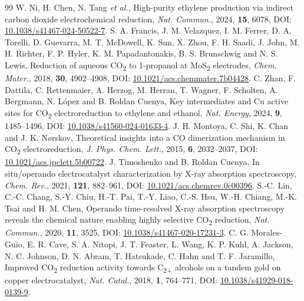 \begin{thebibliography}{99}
 W. Ni, H. Chen, N. Tang \textit{et al.}, High-purity ethylene production via indirect carbon dioxide electrochemical reduction, \textit{Nat. Commun.}, 2024, \textbf{15}, 6078, DOI: \href{https://doi.org/10.1038/s41467-024-50522-7}{10.1038/s41467-024-50522-7}.
 S. A. Francis, J. M. Velazquez, I. M. Ferrer, D. A. Torelli, D. Guevarra, M. T. McDowell, K. Sun, X. Zhou, F. H. Saadi, J. John, M. H. Richter, F. P. Hyler, K. M. Papadantonakis, B. S. Brunschwig and N. S. Lewis, Reduction of aqueous CO\textsubscript{2} to 1-propanol at MoS\textsubscript{2} electrodes, \textit{Chem. Mater.}, 2018, \textbf{30}, 4902--4908, DOI: \href{https://doi.org/10.1021/acs.chemmater.7b04428}{10.1021/acs.chemmater.7b04428}.
 C. Zhan, F. Dattila, C. Rettenmaier, A. Herzog, M. Herran, T. Wagner, F. Scholten, A. Bergmann, N. L\'opez and B. Roldan Cuenya, Key intermediates and Cu active sites for CO\textsubscript{2} electroreduction to ethylene and ethanol, \textit{Nat. Energy}, 2024, \textbf{9}, 1485--1496, DOI: \href{https://doi.org/10.1038/s41560-024-01633-4}{10.1038/s41560-024-01633-4}.
 J. H. Montoya, C. Shi, K. Chan and J. K. N\o rskov, Theoretical insights into a CO dimerization mechanism in CO\textsubscript{2} electroreduction, \textit{J. Phys. Chem. Lett.}, 2015, \textbf{6}, 2032--2037, DOI: \href{https://doi.org/10.1021/acs.jpclett.5b00722}{10.1021/acs.jpclett.5b00722}.
 J. Timoshenko and B. Roldan Cuenya, In situ/operando electrocatalyst characterization by X-ray absorption spectroscopy, \textit{Chem. Rev.}, 2021, \textbf{121}, 882--961, DOI: \href{https://doi.org/10.1021/acs.chemrev.0c00396}{10.1021/acs.chemrev.0c00396}.
 S.-C. Lin, C.-C. Chang, S.-Y. Chiu, H.-T. Pai, T.-Y. Liao, C.-S. Hsu, W.-H. Chiang, M.-K. Tsai and H. M. Chen, Operando time-resolved X-ray absorption spectroscopy reveals the chemical nature enabling highly selective CO\textsubscript{2} reduction, \textit{Nat. Commun.}, 2020, \textbf{11}, 3525, DOI: \href{https://doi.org/10.1038/s41467-020-17231-3}{10.1038/s41467-020-17231-3}.
 C. G. Morales-Guio, E. R. Cave, S. A. Nitopi, J. T. Feaster, L. Wang, K. P. Kuhl, A. Jackson, N. C. Johnson, D. N. Abram, T. Hatsukade, C. Hahn and T. F. Jaramillo, Improved CO\textsubscript{2} reduction activity towards C\textsubscript{2+} alcohols on a tandem gold on copper electrocatalyst, \textit{Nat. Catal.}, 2018, \textbf{1}, 764--771, DOI: \href{https://doi.org/10.1038/s41929-018-0139-9}{10.1038/s41929-018-0139-9}.

\end{thebibliography}
